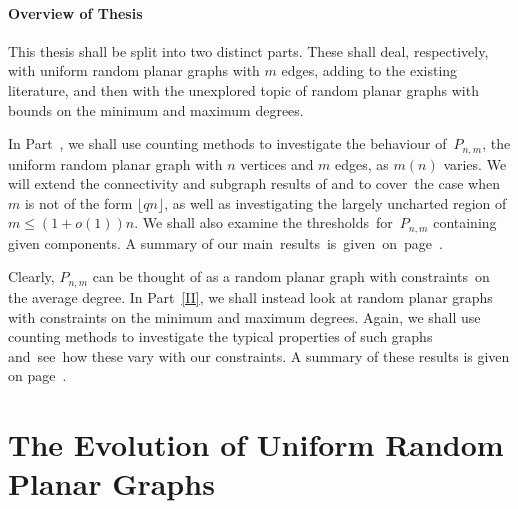 \documentclass{article}
\newtheorem{Proof of Theorem}{Proof of Theorem}
\begin{document}
\subsection*{Overview of Thesis}

This thesis shall be split into two distinct parts.
These shall deal, respectively,
with uniform random planar graphs with $m$ edges,
adding to the existing literature,
and then with the unexplored topic of random planar graphs with bounds on the minimum and maximum degrees.

In Part~\ref{I}, we shall use counting methods to investigate the behaviour of~$P_{n,m}$,
the uniform random planar graph with $n$ vertices and $m$ edges, as $m(n)$ varies.
We will extend the connectivity and subgraph results of \cite{ger} and \cite{gim} to cover~the case when 
$m$ is not of the form $\lfloor qn \rfloor$, 
as well as investigating the largely uncharted region of $m \leq (1+o(1))n$.
We shall also examine the thresholds~for~$P_{n,m}$ containing given components.
A summary of our main~results~is~given~on~page~\pageref{main cpt}.

Clearly, $P_{n,m}$ can be thought of as a random planar graph with constraints~on the average degree.
In Part~\ref{II},
we shall instead look at random planar graphs with constraints on the minimum and maximum degrees.
Again, we shall use counting methods to investigate the typical properties of such graphs 
and~see~how these vary with our constraints.
A summary of these results is given on page~\pageref{sum}.













































\newpage
\part{The Evolution of Uniform Random Planar Graphs} \label{I}
\end{document}
